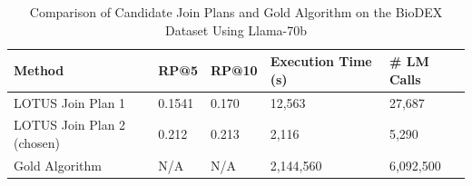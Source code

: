 \begin{footnotesize}

\begin{table}[!t]

\centering
\caption{\small Comparison of Candidate \sys Join Plans and Gold Algorithm on the BioDEX Dataset Using Llama-70b }
\vspace{-.3cm}
\begin{threeparttable}
\begin{tabular}{p{3.0cm}p{.6cm}p{.7cm}p{1.4cm}p{.8cm}}
\toprule
Method & RP@5 & RP@10 & Execution Time (s) & \# LM Calls\\

\hline
LOTUS Join Plan 1 & 0.1541 & 0.170 & 12,563 & 27,687 \\
LOTUS Join Plan 2 (chosen)  & 0.212 & 0.213 & 2,116& 5,290 \\
Gold Algorithm & N/A & N/A & 2,144,560 & 6,092,500 \\
\bottomrule

\end{tabular}
\end{threeparttable}
\label{tab:biodex_plans}

\end{table}


\end{footnotesize}

